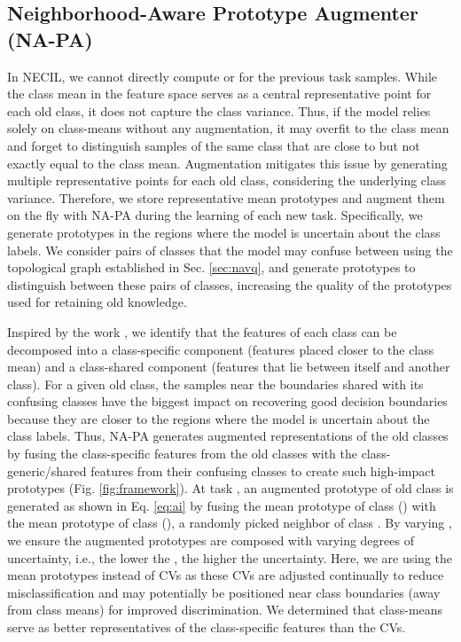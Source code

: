 \documentclass[10pt,twocolumn,letterpaper]{article}
\begin{document}
\subsection{Neighborhood-Aware Prototype Augmenter (NA-PA)}\label{sec:pa}

In NECIL, we cannot directly 
compute  or  for the previous task samples. 
While the class mean in the feature space serves as a central representative point for each old class, it does not capture the class variance. Thus, if the model relies solely on class-means without any augmentation, it may overfit to the class mean and forget to distinguish samples of the same class that are close to but not exactly equal to the class mean. Augmentation mitigates this issue by generating multiple representative points for each old class, considering the underlying class variance. Therefore, we store representative mean prototypes
and augment them on the fly with NA-PA during the learning of each new task. Specifically, we generate prototypes in the regions where the model is uncertain about the class labels. We consider pairs of classes that the model may confuse between using the topological graph  established in Sec. \ref{sec:navq}, and generate prototypes to distinguish between these pairs of classes, increasing the quality of the prototypes used for retaining old knowledge.

Inspired by the work \cite{Chu2020FeatureData}, we identify that the features of each class can be decomposed into a class-specific component (features placed closer to the class mean) and a class-shared component (features that lie between itself and another class). For a given old class, the samples near the boundaries shared with its confusing classes have the biggest impact on recovering good decision boundaries because they are closer to the regions where the model is uncertain about the class labels. Thus, NA-PA generates augmented representations of the old classes by fusing the class-specific features from the old classes with the class-generic/shared features from their confusing classes to create such high-impact prototypes (Fig. \ref{fig:framework}). 
At task , an augmented prototype  of old class  is generated as shown in Eq. \ref{eq:ai} by fusing the mean prototype of class  () with the mean prototype of class   (), a randomly picked neighbor of class . By varying , we ensure the augmented prototypes are composed with varying degrees of uncertainty, i.e., the lower the , the higher the uncertainty. Here, we are using the mean prototypes instead of CVs as these CVs are adjusted continually to reduce misclassification and may potentially be positioned near class boundaries (away from class means) for improved discrimination. We determined that class-means serve as better representatives of the class-specific features than the CVs. 
\end{document}
